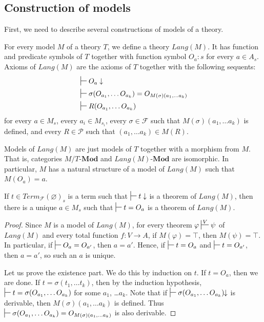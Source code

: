 \documentclass[reqno]{amsart}
\theoremstyle{definition}
\theoremstyle{remark}
\newcommand{\cat}[1]{\mathbf{#1}}
\newcommand{\Mod}[1]{#1\text{-}\cat{Mod}}
\numberwithin{figure}{section}
\begin{document}
\subsection{Construction of models}

First, we need to describe several constructions of models of a theory.

For every model $M$ of a theory $T$, we define a theory $Lang(M)$.
It has function and predicate symbols of $T$ together with function symbol $O_a : s$ for every $a \in A_s$.
Axioms of $Lang(M)$ are the axioms of $T$ together with the following sequents:
\begin{align*}
& \sststile{}{} O_a \downarrow \\
& \sststile{}{} \sigma(O_{a_1}, \ldots O_{a_k}) = O_{M(\sigma)(a_1, \ldots a_k)} \\
& \sststile{}{} R(O_{a_1}, \ldots O_{a_k})
\end{align*}
for every $a \in M_s$, every $a_i \in M_{s_i}$,
every $\sigma \in \mathcal{F}$ such that $M(\sigma)(a_1, \ldots a_k)$ is defined,
and every $R \in \mathcal{P}$ such that $(a_1, \ldots a_k) \in M(R)$.

Models of $Lang(M)$ are just models of $T$ together with a morphism from $M$.
That is, categories $M/\Mod{T}$ and $\Mod{Lang(M)}$ are isomorphic.
In particular, $M$ has a natural structure of a model of $Lang(M)$ such that $M(O_a) = a$.

\begin{lem}[cl-term]
If $t \in Term_\mathcal{F}(\varnothing)_s$ is a term such that $\sststile{}{} t \downarrow$ is a theorem of $Lang(M)$,
    then there is a unique $a \in M_s$ such that $\sststile{}{} t = O_a$ is a theorem of $Lang(M)$.
\end{lem}
\begin{proof}
Since $M$ is a model of $Lang(M)$, for every theorem $\varphi \sststile{}{V} \psi$ of $Lang(M)$
and every total function $f : V \to A$, if $M(\varphi) = \top$, then $M(\psi) = \top$.
In particular, if $\sststile{}{} O_a = O_{a'}$, then $a = a'$.
Hence, if $\sststile{}{} t = O_a$ and $\sststile{}{} t = O_{a'}$, then $a = a'$, so such an $a$ is unique.

Let us prove the existence part.
We do this by induction on $t$.
If $t = O_a$, then we are done.
If $t = \sigma(t_1, \ldots t_k)$, then by the induction hypothesis, $\sststile{}{} t = \sigma(O_{a_1}, \ldots O_{a_k})$ for some $a_1$, \ldots $a_k$.
Note that if $\sststile{}{} \sigma(O_{a_1}, \ldots O_{a_k})\!\!\downarrow$ is derivable, then $M(\sigma)(a_1, \ldots a_k)$ is defined.
Thus $\sststile{}{} \sigma(O_{a_1}, \ldots O_{a_k}) = O_{M(\sigma)(a_1, \ldots a_k)}$ is also derivable.
\end{proof}
\end{document}
